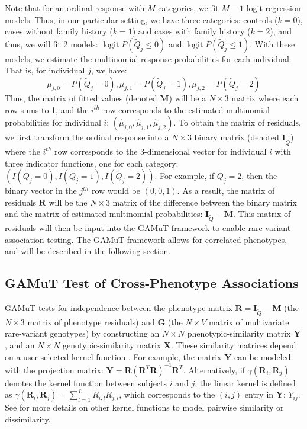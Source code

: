 \documentclass[]{article}
\DeclareMathOperator{\logit}{logit}
\begin{document}
Note that for an ordinal response with \(M\) categories, we fit \(M-1\) logit regression models. Thus, in our particular setting, we have three categories: controls (\(k=0\)), cases without family history (\(k=1\)) and cases with family history (\(k=2\)), and thus, we will fit 2 models: \(\logit P(\tilde{Q}_j \leq 0)\) and \(\logit P(\tilde{Q}_j \leq 1)\).
With these models, we estimate the multinomial response probabilities for each individual. That is, for individual \(j\), we have:
\[
\mu_{j,0} = P(\tilde{Q}_j=0),
\mu_{j,1} = P(\tilde{Q}_j=1),
\mu_{j,2} = P(\tilde{Q}_j=2)
\]
Thus, the matrix of fitted values (denoted \(\mathbf{M}\)) will be a \(N \times 3\) matrix where each row sums to 1, and the \(i^{th}\) row corresponds to the estimated multinomial probabilities for individual \(i\): \((\hat{\mu}_{j,0},\hat{\mu}_{j,1},\hat{\mu}_{j,2})\).
To obtain the matrix of residuals, we first transform the ordinal response into a \(N \times 3\) binary matrix (denoted \(\mathbf{I}_{\tilde{Q}}\)) where the \(i^{th}\) row corresponds to the 3-dimensional vector for individual \(i\) with three indicator functions, one for each category: \((I(\tilde{Q}_j=0), I(\tilde{Q}_j=1), I(\tilde{Q}_j=2))\). For example, if \(\tilde{Q}_j=2\), then the binary vector in the \(j^{th}\) row would be \((0,0,1)\). As a result, the matrix of residuals \(\mathbf{R}\) will be the \(N \times 3\) matrix of the
difference between the binary matrix and the matrix of estimated multinomial probabilities: \(\mathbf{I}_{\tilde{Q}}-\mathbf{M}\). This matrix of residuals will then be input into the GAMuT framework to enable rare-variant association testing. The GAMuT framework allows for correlated phenotypes, and will be described in the following section.

\hypertarget{gamut-test-of-cross-phenotype-associations}{%
\subsection{GAMuT Test of Cross-Phenotype Associations}\label{gamut-test-of-cross-phenotype-associations}}

GAMuT tests for independence between the phenotype matrix \(\mathbf{R}=\mathbf{I}_{\tilde{Q}}-\mathbf{M}\) (the \(N \times 3\) matrix of phenotype residuals) and \(\mathbf{G}\) (the \(N \times V\) matrix of multivariate
rare-variant genotypes) by constructing an \(N \times N\) phenotypic-similarity
matrix \(\mathbf{Y}\), and an \(N \times N\) genotypic-similarity matrix \(\mathbf{X}\).
These similarity matrices depend on a user-selected kernel function \citep{Kwee2008, Schaid2010, Wu2010, Wu2011}. For example, the matrix \(\mathbf{Y}\) can be modeled with the projection matrix: \(\mathbf{Y} = \mathbf{R} (\mathbf{R}^T\mathbf{R})^{-1}\mathbf{R}^T\). Alternatively, if \(\gamma(\mathbf{R}_i,\mathbf{R}_j)\) denotes the kernel function between subjects \(i\) and \(j\), the linear kernel is defined as \(\gamma(\mathbf{R}_i,\mathbf{R}_j)= \sum_{l=1}^L R_{i,l} R_{j,l}\), which corresponds to the \((i,j)\) entry in \(\mathbf{Y}\): \(Y_{ij}\).
See \citet{Broadaway2016} for more details on other kernel functions to model pairwise similarity or dissimilarity.
\end{document}
